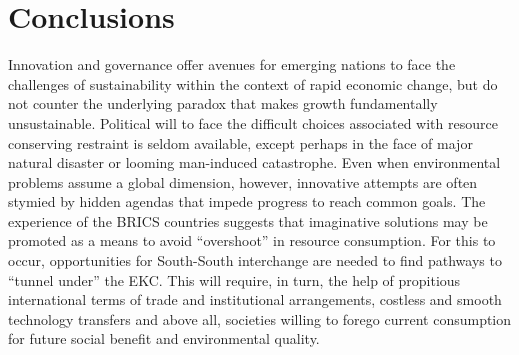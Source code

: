 \section{Conclusions}
Innovation and governance offer avenues for emerging nations to face the challenges of sustainability within the context of rapid economic change, but do not counter the underlying paradox that makes growth fundamentally unsustainable. Political will to face the difficult choices associated with resource conserving restraint is seldom available, except perhaps in the face of major natural disaster or looming man-induced catastrophe. Even when environmental problems assume a global dimension, however, innovative attempts are often stymied by hidden agendas that impede progress to reach common goals. The experience of the BRICS countries suggests that imaginative solutions may be promoted as a means to avoid “overshoot” in resource consumption. For this to occur, opportunities for South-South interchange are needed to find pathways to “tunnel under” the EKC. This will require, in turn, the help of propitious international terms of trade and institutional arrangements, costless and smooth technology transfers and above all, societies willing to forego current consumption for future social benefit and environmental quality.  


